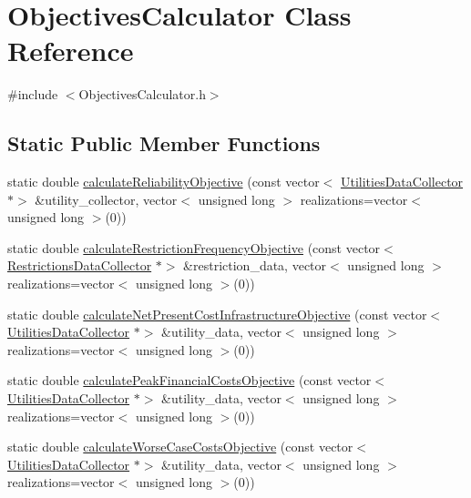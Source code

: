 \hypertarget{classObjectivesCalculator}{}\section{Objectives\+Calculator Class Reference}
\label{classObjectivesCalculator}


{\ttfamily \#include $<$Objectives\+Calculator.\+h$>$}

\subsection*{Static Public Member Functions}
\begin{DoxyCompactItemize}
\item 
static double \mbox{\hyperlink{classObjectivesCalculator_a4cb12f9bb7861368c999d435477593c4_a4cb12f9bb7861368c999d435477593c4}{calculate\+Reliability\+Objective}} (const vector$<$ \mbox{\hyperlink{classUtilitiesDataCollector}{Utilities\+Data\+Collector}} $\ast$$>$ \&utility\+\_\+collector, vector$<$ unsigned long $>$ realizations=vector$<$ unsigned long $>$(0))
\item 
static double \mbox{\hyperlink{classObjectivesCalculator_aba30dbaf1a1520282f81c683fe00b5ed_aba30dbaf1a1520282f81c683fe00b5ed}{calculate\+Restriction\+Frequency\+Objective}} (const vector$<$ \mbox{\hyperlink{classRestrictionsDataCollector}{Restrictions\+Data\+Collector}} $\ast$$>$ \&restriction\+\_\+data, vector$<$ unsigned long $>$ realizations=vector$<$ unsigned long $>$(0))
\item 
static double \mbox{\hyperlink{classObjectivesCalculator_a5619e4472f8e96bc6fa274002d4809f1_a5619e4472f8e96bc6fa274002d4809f1}{calculate\+Net\+Present\+Cost\+Infrastructure\+Objective}} (const vector$<$ \mbox{\hyperlink{classUtilitiesDataCollector}{Utilities\+Data\+Collector}} $\ast$$>$ \&utility\+\_\+data, vector$<$ unsigned long $>$ realizations=vector$<$ unsigned long $>$(0))
\item 
static double \mbox{\hyperlink{classObjectivesCalculator_a2352c178eab40798324120102cc7891b_a2352c178eab40798324120102cc7891b}{calculate\+Peak\+Financial\+Costs\+Objective}} (const vector$<$ \mbox{\hyperlink{classUtilitiesDataCollector}{Utilities\+Data\+Collector}} $\ast$$>$ \&utility\+\_\+data, vector$<$ unsigned long $>$ realizations=vector$<$ unsigned long $>$(0))
\item 
static double \mbox{\hyperlink{classObjectivesCalculator_a74cf53d4a7abbb2ea34304844262a826_a74cf53d4a7abbb2ea34304844262a826}{calculate\+Worse\+Case\+Costs\+Objective}} (const vector$<$ \mbox{\hyperlink{classUtilitiesDataCollector}{Utilities\+Data\+Collector}} $\ast$$>$ \&utility\+\_\+data, vector$<$ unsigned long $>$ realizations=vector$<$ unsigned long $>$(0))
\end{DoxyCompactItemize}


